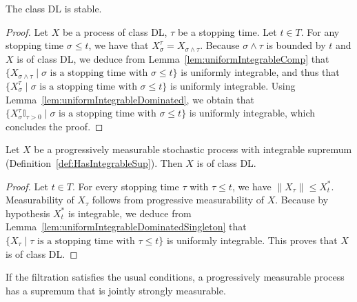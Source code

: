 \begin{lemma}\label{lem:isStable_classDL}
  \leanok
The class DL is stable.
\end{lemma}

\begin{proof}\leanok
Let $X$ be a process of class DL, $\tau$ be a stopping time. Let $t \in T$. For any stopping time $\sigma \le t$, we have that $X_\sigma^\tau = X_{\sigma \land \tau}$. Because $\sigma \land \tau$ is bounded by $t$ and $X$ is of class DL, we deduce from Lemma~\ref{lem:uniformIntegrableComp} that $\{X_{\sigma \land \tau} \mid \sigma \text{ is a stopping time with } \sigma \le t\}$ is uniformly integrable, and thus that $\{X^\tau_\sigma \mid \sigma \text{ is a stopping time with } \sigma \le t\}$ is uniformly integrable. Using Lemma~\ref{lem:uniformIntegrableDominated}, we obtain that $\{X^\tau_\sigma \mathbb{I}_{\tau > 0} \mid \sigma \text{ is a stopping time with } \sigma \le t\}$ is uniformly integrable, which concludes the proof.
\end{proof}


\begin{lemma}\label{lem:Integrable.classDL}
  \leanok
Let $X$ be a progressively measurable stochastic process with integrable supremum (Definition~\ref{def:HasIntegrableSup}). Then $X$ is of class DL.
\end{lemma}

\begin{proof}\leanok
Let $t \in T$. For every stopping time $\tau$ with $\tau \le t$, we have $\|X_\tau\| \le X^*_t$.
Measurability of $X_\tau$ follows from progressive measurability of $X$.
Because by hypothesis $X^*_t$ is integrable, we deduce from Lemma~\ref{lem:uniformIntegrableDominatedSingleton} that $\{X_\tau \mid \tau \text{ is a stopping time with } \tau \le t\}$ is uniformly integrable.
This proves that $X$ is of class DL.
\end{proof}


\begin{lemma}\label{lem:IsStronglyProgressive.hasStronglyMeasurableSup}
  \leanok
  If the filtration satisfies the usual conditions, a progressively measurable process has a supremum that is jointly strongly measurable.
\end{lemma}

